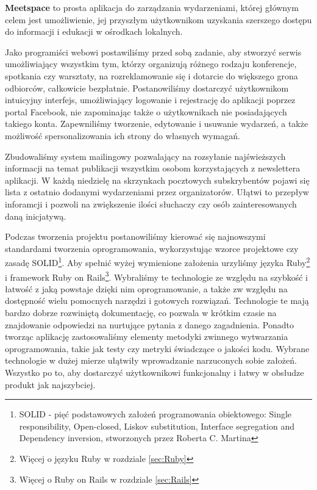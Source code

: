 \textbf{Meetspace} to prosta aplikacja do zarządzania wydarzeniami, której głównym celem jest umożliwienie, jej przyszłym użytkownikom uzyskania szerszego dostępu do informacji i edukacji w ośrodkach lokalnych.


Jako programiści webowi postawiliśmy przed sobą zadanie, aby stworzyć serwis umożliwiający wszystkim tym, którzy organizują różnego rodzaju konferencje, spotkania czy warsztaty, na rozreklamowanie się i dotarcie do większego grona odbiorców, całkowicie bezpłatnie.
Postanowiliśmy dostarczyć użytkownikom intuicyjny interfejs, umożliwiający logowanie i rejestrację do aplikacji poprzez portal Facebook, nie zapominając także o użytkownikach nie posiadających takiego konta. Zapewniliśmy tworzenie, edytowanie i usuwanie wydarzeń, a także
możliwość spersonalizowania ich strony do własnych wymagań.


Zbudowaliśmy system mailingowy pozwalający na rozsyłanie najświeższych informacji na temat publikacji wszystkim osobom korzystających z newslettera aplikacji. W każdą niedzielę na skrzynkach pocztowych subskrybentów pojawi się lista z ostatnio dodanymi wydarzeniami przez organizatorów. Ułątwi to przepływ inforamcji i pozwoli na zwiększenie ilości słuchaczy czy osób zainteresowanych daną inicjatywą.

Podczas tworzenia projektu postanowiliśmy kierować się najnowszymi standardami tworzenia oprogramowania, wykorzystując wzorce projektowe czy zasadę SOLID\footnote{SOLID - pięć podstawowych założeń programowania obiektowego: Single responsibility, Open-closed, Liskov substitution, Interface segregation and Dependency inversion,  stworzonych przez Roberta C. Martina}. Aby spełnić wyżej wymienione założenia urzyliśmy języka  Ruby\footnote{Więcej o języku Ruby w rozdziale \ref{sec:Ruby}} i framework  Ruby on Rails\footnote{Więcej o Ruby on Rails w rozdziale \ref{sec:Rails}}. Wybraliśmy te technologie ze względu na szybkość i łatwość z jaką powstaje dzięki nim oprogramowanie, a także zw względu na dostępność wielu pomocnych narzędzi i gotowych rozwiązań. Technologie te mają bardzo dobrze rozwiniętą dokumentację, co pozwala w krótkim czasie na znajdowanie odpowiedzi na nurtujące pytania z danego zagadnienia. Ponadto tworząc aplikację zastosowaliśmy elementy metodyki zwinnego wytwarzania oprogramowania, takie jak testy czy metryki świadczące o jakości kodu. Wybrane technologie w dużej mierze ułątwiły wprowadzanie narzuconych sobie założeń.
Wszystko po to, aby dostarczyć użytkownikowi funkcjonalny i łatwy w obsłudze produkt jak najszybciej.
